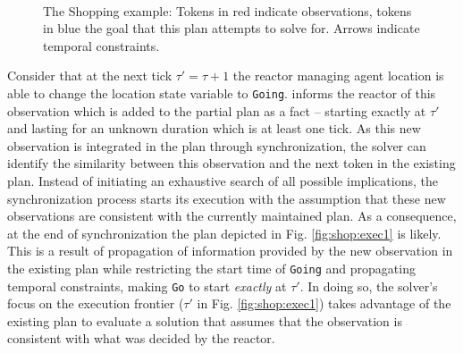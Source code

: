 \begin{figure}[!htb]
  \centering
   \\
    \caption{\small The Shopping example: Tokens in {\color{red}red}
      indicate observations, tokens in {\color{blue}blue} the goal
      that this plan attempts to solve for. Arrows indicate temporal
      constraints. }
  \label{fig:shop:exec}
\end{figure}

Consider that at the next tick $\tau' = \tau+1$ the reactor managing
agent location is able to change the location state variable to
\texttt{Going}. \rx informs the reactor of this observation which is
added to the partial plan as a fact -- starting exactly at $\tau'$ and
lasting for an unknown duration which is at least one tick. As this
new observation is integrated in the plan through synchronization, the
solver can identify the similarity between this observation and the
next token in the existing plan. Instead of initiating an exhaustive
search of all possible implications, the synchronization process
starts its execution with the assumption that these new observations
are consistent with the currently maintained plan. As a consequence,
at the end of synchronization the plan depicted in Fig.
\ref{fig:shop:exec1} is likely. This is a result of propagation of
information provided by the new observation in the existing plan while
restricting the start time of \texttt{Going} and propagating temporal
constraints, making \texttt{Go} to start {\em exactly} at $\tau'$. In
doing so, the \eu solver's focus on the execution frontier ($\tau'$ in
Fig. \ref{fig:shop:exec1}) takes advantage of the existing plan to
evaluate a solution that assumes that the observation is consistent
with what was decided by the reactor.

